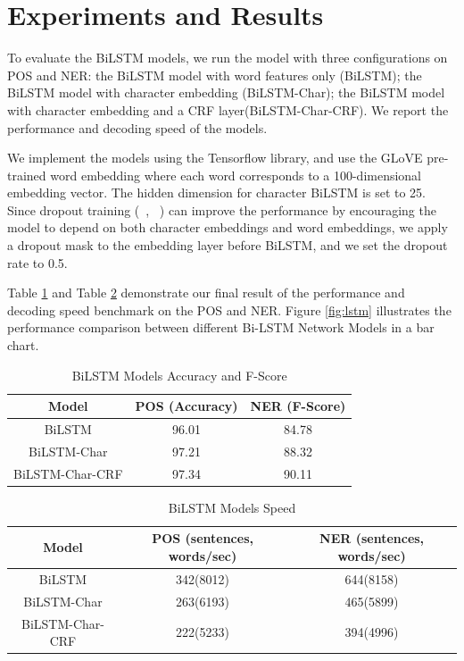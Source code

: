 \documentclass{sfuthesis}
\begin{document}
 
\section{Experiments and Results}

To evaluate the BiLSTM models, we run the model with three configurations on POS and NER: the BiLSTM model with word features only (BiLSTM); the BiLSTM model with character embedding (BiLSTM-Char); the BiLSTM model with character embedding and a CRF layer(BiLSTM-Char-CRF). We report the performance and decoding speed of the models. 

We implement the models using the Tensorflow library, and use the GLoVE pre-trained word embedding where each word corresponds to a 100-dimensional embedding vector. The hidden dimension for character BiLSTM is set to 25. Since dropout training (~\citeauthor{hinton2012improving}, ~\citeyear{hinton2012improving}) can improve the performance by encouraging the model to depend on both character embeddings and word embeddings, we apply a dropout mask to the embedding layer before BiLSTM, and we set the dropout rate to 0.5.

Table \ref{table:lstm-table1} and Table \ref{table:lstm-table2} demonstrate our final result of the performance and decoding speed benchmark on the POS and NER. Figure \ref{fig:lstm} illustrates the performance comparison between different Bi-LSTM Network Models in a bar chart.

\begin{table}[]
\centering
\caption{BiLSTM Models Accuracy and F-Score}
\label{table:lstm-table1}
\begin{tabular}{|c|c|c|}
\hline
Model         & POS (Accuracy)  & NER (F-Score)       \\ \hline
BiLSTM  & 96.01     & 84.78                             \\ \hline
BiLSTM-Char & 97.21 & 88.32             \\ \hline
BiLSTM-Char-CRF & 97.34  & 90.11             \\ \hline
\end{tabular}
\end{table}

\begin{table}[]
\centering
\caption{BiLSTM Models Speed}
\label{table:lstm-table2}
\begin{tabular}{|c|c|c|}
\hline
Model       & POS  (sentences, words/sec)  & NER  (sentences, words/sec)      \\ \hline
BiLSTM             & 342(8012)     & 644(8158)       \\ \hline
BiLSTM-Char        & 263(6193)  & 465(5899)             \\ \hline
BiLSTM-Char-CRF    & 222(5233)  & 394(4996)         \\ \hline
\end{tabular}
\end{table}
\end{document}
